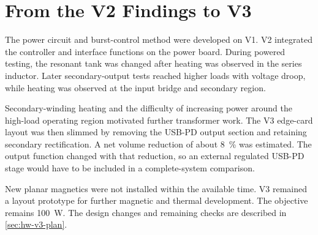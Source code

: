 \section{From the V2 Findings to V3}
\label{sec:intro-v3}

The power circuit and burst-control method were developed on V1. V2
integrated the controller and interface functions on the power board.
During powered testing, the resonant tank was changed after heating was
observed in the series inductor. Later secondary-output tests reached higher loads with voltage droop, while heating was observed at the input bridge and secondary region.

Secondary-winding heating and the difficulty of increasing power around
the high-load operating region motivated further transformer work. The
V3 edge-card layout was then slimmed by removing the USB-PD output section
and retaining secondary rectification. A net volume reduction of about
\SI{8}{\percent} was estimated. The output function changed with that
reduction, so an external regulated USB-PD stage would have to be included
in a complete-system comparison.

New planar magnetics were not installed within the available time. V3
remained a layout prototype for further magnetic and thermal development.
The objective remains \SI{100}{\watt}. The design changes and remaining
checks are described in \cref{sec:hw-v3-plan}.

